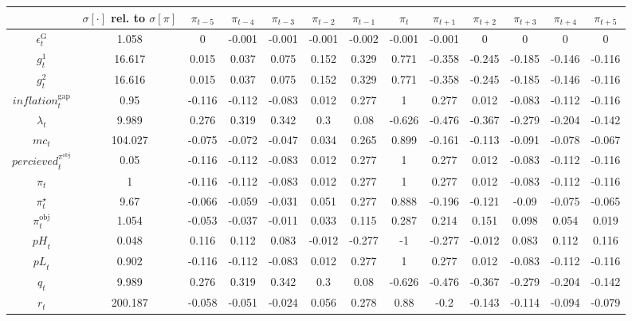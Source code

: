 \begin{tabular}{c|c|c|c|c|c|c|c|c|c|c|c|c|}
  & $\sigma[\cdot]$ rel. to $\sigma[\pi]$ & $\pi_{t-5}$ & $\pi_{t-4}$ & $\pi_{t-3}$ & $\pi_{t-2}$ & $\pi_{t-1}$ & $\pi_{t}$ & $\pi_{t+1}$ & $\pi_{t+2}$ & $\pi_{t+3}$ & $\pi_{t+4}$ & $\pi_{t+5}$\\
\hline
$\epsilon^{\mathrm{G}}_{t}$ & 1.058 & 0 & -0.001 & -0.001 & -0.001 & -0.002 & -0.001 & -0.001 & 0 & 0 & 0 & 0 \\
$g^{\mathrm{1}}_{t}$ & 16.617 & 0.015 & 0.037 & 0.075 & 0.152 & 0.329 & 0.771 & -0.358 & -0.245 & -0.185 & -0.146 & -0.116 \\
$g^{\mathrm{2}}_{t}$ & 16.616 & 0.015 & 0.037 & 0.075 & 0.152 & 0.329 & 0.771 & -0.358 & -0.245 & -0.185 & -0.146 & -0.116 \\
${i\!n\!f\!l\!a\!t\!i\!o\!n}^{\mathrm{gap}}_{t}$ & 0.95 & -0.116 & -0.112 & -0.083 & 0.012 & 0.277 & 1 & 0.277 & 0.012 & -0.083 & -0.112 & -0.116 \\
$\lambda_{t}$ & 9.989 & 0.276 & 0.319 & 0.342 & 0.3 & 0.08 & -0.626 & -0.476 & -0.367 & -0.279 & -0.204 & -0.142 \\
${m\!c}_{t}$ & 104.027 & -0.075 & -0.072 & -0.047 & 0.034 & 0.265 & 0.899 & -0.161 & -0.113 & -0.091 & -0.078 & -0.067 \\
${p\!e\!r\!c\!i\!e\!v\!e\!d}^{\pi^{\mathrm{obj}}}_{t}$ & 0.05 & -0.116 & -0.112 & -0.083 & 0.012 & 0.277 & 1 & 0.277 & 0.012 & -0.083 & -0.112 & -0.116 \\
$\pi_{t}$ & 1 & -0.116 & -0.112 & -0.083 & 0.012 & 0.277 & 1 & 0.277 & 0.012 & -0.083 & -0.112 & -0.116 \\
$\pi^{\star}_{t}$ & 9.67 & -0.066 & -0.059 & -0.031 & 0.051 & 0.277 & 0.888 & -0.196 & -0.121 & -0.09 & -0.075 & -0.065 \\
$\pi^{\mathrm{obj}}_{t}$ & 1.054 & -0.053 & -0.037 & -0.011 & 0.033 & 0.115 & 0.287 & 0.214 & 0.151 & 0.098 & 0.054 & 0.019 \\
${p\!H}_{t}$ & 0.048 & 0.116 & 0.112 & 0.083 & -0.012 & -0.277 & -1 & -0.277 & -0.012 & 0.083 & 0.112 & 0.116 \\
${p\!L}_{t}$ & 0.902 & -0.116 & -0.112 & -0.083 & 0.012 & 0.277 & 1 & 0.277 & 0.012 & -0.083 & -0.112 & -0.116 \\
$q_{t}$ & 9.989 & 0.276 & 0.319 & 0.342 & 0.3 & 0.08 & -0.626 & -0.476 & -0.367 & -0.279 & -0.204 & -0.142 \\
$r_{t}$ & 200.187 & -0.058 & -0.051 & -0.024 & 0.056 & 0.278 & 0.88 & -0.2 & -0.143 & -0.114 & -0.094 & -0.079 \\

\end{tabular}
